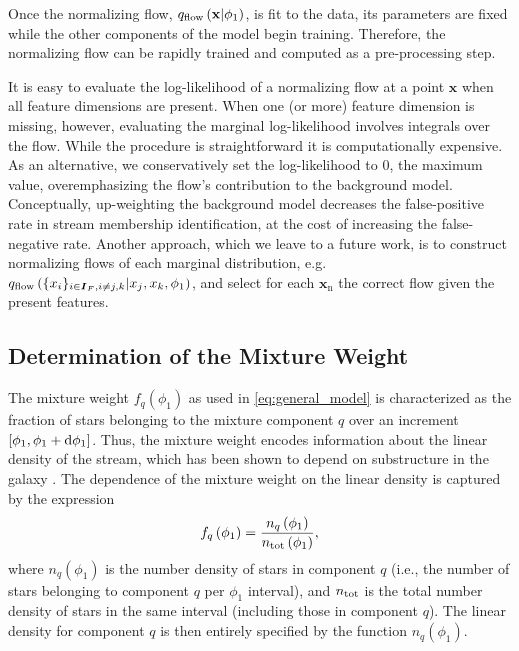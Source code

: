 \documentclass[twocolumn, linenumbers]{aastex631}
\newcommand{\mrm}[1]{\mathrm{#1}}
\newcommand{\mbs}[1]{\boldsymbol{#1}}
\newcommand{\nth}[1]{{#1}_{\mrm{n}}}  %
\begin{document}
        Once the normalizing flow, $q_{\rm flow}\left(\mathbf{x} |
        \phi_1\right)$, is fit to the data, its parameters are fixed while the
        other components of the model begin training. Therefore, the normalizing
        flow can be rapidly trained and computed as a pre-processing step.

        It is easy to evaluate the log-likelihood of a normalizing flow at a
        point $\mbs{x}$ when all feature dimensions are present. When one (or
        more) feature dimension is missing, however, evaluating the marginal
        log-likelihood involves integrals over the flow. While the procedure is
        straightforward it is computationally expensive. As an alternative, we
        conservatively set the log-likelihood to $0$, the maximum value,
        overemphasizing the flow's contribution to the background model.
        Conceptually, up-weighting the background model decreases the
        false-positive rate in stream membership identification, at the cost of
        increasing the false-negative rate.  Another approach, which we leave to
        a future work, is to construct normalizing flows of each marginal
        distribution, e.g. $q_{\rm flow}\left(\{x_i\}_{i \in \mbs{I}_F, i \neq
        {j, k}} | x_j, x_k, \phi_1\right)$, and select for each $\nth{\mbs{x}}$
        the correct flow given the present features.



    \vspace{10pt}
    \subsection{Determination of the Mixture Weight} \label{sub:method:mixture_weight}

        The mixture weight $f_q(\phi_1)$ as used in \autoref{eq:general_model}
        is characterized as the fraction of stars belonging to the mixture
        component $q$ over an increment $[\phi_1, \phi_1 + \dif{\phi_1}]$. Thus,
        the mixture weight encodes information about the linear density of the
        stream, which has been shown to depend on substructure in the galaxy
        \citep{Siegal-GaskinsValluri2009, Yoon+2011}. The dependence of the
        mixture weight on the linear density is captured by the expression
        \begin{equation}\label{eq:fraction_param}
            f_q\left(\phi_1\right) = \frac{n_q\left(\phi_1\right)}{n_{\rm tot}\left(\phi_1\right)},
        \end{equation}
        where $n_q\left(\phi_1\right)$ is the number density of stars in
        component $q$ (i.e., the number of stars belonging to component $q$ per
        $\phi_1$ interval), and $n_{\rm tot}$ is the total number density of
        stars in the same interval (including those in component $q$). The
        linear  density for component $q$ is then entirely specified by the
        function $n_q(\phi_1)$.
\end{document}
